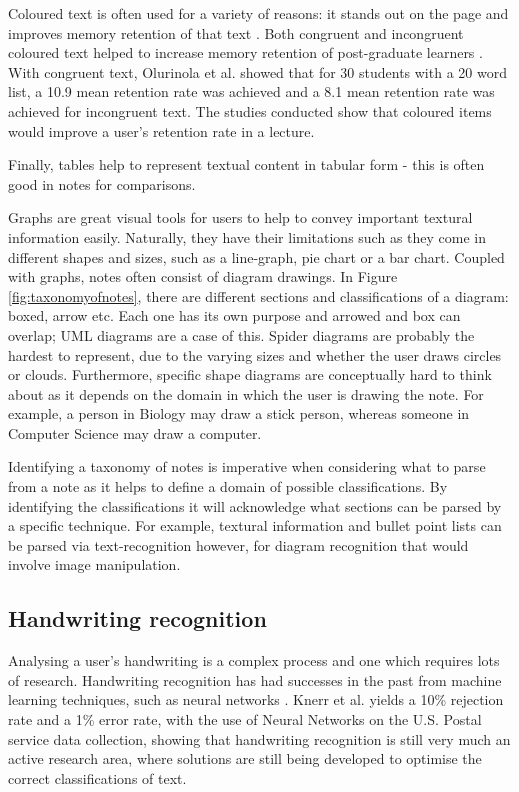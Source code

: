 Coloured text is often used for a variety of reasons: it stands out on the page and improves memory retention of that text \cite{citeulike:14014177}. Both congruent and incongruent  coloured text helped to increase memory retention of post-graduate learners \cite{Olurinola_Tayo_2015}. With congruent text, Olurinola et al. showed that for 30 students with a 20 word list, a 10.9 mean retention rate was achieved and a 8.1 mean retention rate was achieved for incongruent text. The studies conducted show that coloured items would improve a user's retention rate in a lecture.

Finally, tables help to represent textual content in tabular form - this is often good in notes for comparisons.

Graphs are great visual tools for users to help to convey important textural information easily. Naturally, they have their limitations such as they come in different shapes and sizes, such as a line-graph, pie chart or a bar chart. Coupled with graphs, notes often consist of diagram drawings.  In Figure \ref{fig:taxonomyofnotes}, there are different sections and classifications of a diagram: boxed, arrow etc. Each one has its own purpose and arrowed and box can overlap; UML diagrams are a case of this. Spider diagrams are probably the hardest to represent, due to the varying sizes and whether the user draws circles or clouds. Furthermore, specific shape diagrams are conceptually hard to think about as it depends on the domain in which the user is drawing the note. For example, a person in Biology may draw a stick person, whereas someone in Computer Science may draw a computer.

Identifying a taxonomy of notes is imperative when considering what to parse from a note as it helps to define a domain of possible classifications. By identifying the classifications it will acknowledge what sections can be parsed by a specific technique. For example, textural information and bullet point lists can be parsed via text-recognition however, for diagram recognition that would involve image manipulation.


\subsection{Handwriting recognition}
Analysing a user's handwriting is a complex process and one which requires lots of research. Handwriting recognition has had successes in the past from machine learning techniques, such as neural networks \cite{citeulike:13510433}. Knerr et al. yields a 10\% rejection rate and  a 1\% error rate, with the use of Neural Networks on the U.S. Postal service data collection, showing that handwriting recognition is still very much an active research area, where solutions are still being developed to optimise the correct classifications of text.

